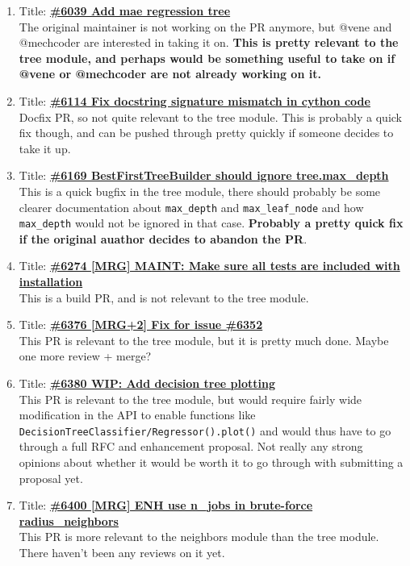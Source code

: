 \documentclass[12pt, oneside]{article}
\begin{document}
\begin{enumerate}
  \item
  Title:
  \textbf{\href{https://github.com/scikit-learn/scikit-learn/pull/6039}
    {\#6039 Add mae regression tree}}\\
  The original maintainer is not working on the PR anymore, but @vene
  and @mechcoder are interested in taking it on. \textbf{This is
    pretty relevant to the tree module, and perhaps would be something
  useful to take on if @vene or @mechcoder are not already working on it.}

  \item
  Title:
  \textbf{\href{https://github.com/scikit-learn/scikit-learn/pull/6114}
    {\#6114 Fix docstring signature mismatch in cython code}}\\
  Docfix PR, so not quite relevant to the tree module. This is
  probably a quick fix though, and can be pushed through pretty
  quickly if someone decides to take it up.

  \item
  Title:
  \textbf{\href{https://github.com/scikit-learn/scikit-learn/pull/6169}
    {\#6169 BestFirstTreeBuilder should ignore tree.max\_depth}}\\
  This is a quick bugfix in the tree module, there should probably be
  some clearer documentation about \texttt{max\_depth} and
  \texttt{max\_leaf\_node} and how \texttt{max\_depth} would not be
  ignored in that case. \textbf{Probably a pretty quick fix if the
    original auathor decides to abandon the PR}. 

  \item
  Title:
  \textbf{\href{https://github.com/scikit-learn/scikit-learn/pull/6274}
    {\#6274 [MRG] MAINT: Make sure all tests are included with installation}}\\
  This is a build PR, and is not relevant to the tree module.

  \item
  Title:
  \textbf{\href{https://github.com/scikit-learn/scikit-learn/pull/6376}
    {\#6376 [MRG+2] Fix for issue \#6352}}\\
  This PR is relevant to the tree module, but it is pretty much
  done. Maybe one more review + merge?

  \item
  Title:
  \textbf{\href{https://github.com/scikit-learn/scikit-learn/pull/6380}
    {\#6380 WIP: Add decision tree plotting}}\\
  This PR is relevant to the tree module, but would require fairly
  wide modification in the API to enable functions like
  \texttt{DecisionTreeClassifier/Regressor().plot()} and would thus
  have to go through a full RFC and enhancement proposal. Not really
  any strong opinions about whether it would be worth it to go through
  with submitting a proposal yet.

  \item
  Title:
  \textbf{\href{https://github.com/scikit-learn/scikit-learn/pull/6400}
    {\#6400 [MRG] ENH use n\_jobs in brute-force radius\_neighbors}}\\
  This PR is more relevant to the neighbors module than the tree
  module. There haven't been any reviews on it yet.
\end{enumerate}
\end{document}
